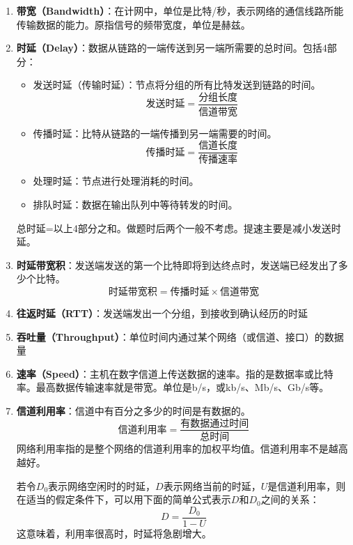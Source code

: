 \documentclass[12pt, a4paper, oneside]{ctexart}
\begin{document}
\begin{enumerate}
    \item {\bf 带宽（Bandwidth）}：在计网中，单位是比特/秒，表示网络的通信线路所能传输数据的能力。原指信号的频带宽度，单位是赫兹。
    \item {\bf 时延（Delay）}：数据从链路的一端传送到另一端所需要的总时间。包括4部分：
    \begin{itemize}
        \item 发送时延（传输时延）：节点将分组的所有比特发送到链路的时间。
        \begin{equation*}
            \text{发送时延}=\frac{\text{分组长度}}{\text{信道带宽}}
        \end{equation*}
        \item 传播时延：比特从链路的一端传播到另一端需要的时间。
        \begin{equation*}
            \text{传播时延}=\frac{\text{信道长度}}{\text{传播速率}}
        \end{equation*}
        \item 处理时延：节点进行处理消耗的时间。
        \item 排队时延：数据在输出队列中等待转发的时间。
    \end{itemize}
    总时延=以上4部分之和。做题时后两个一般不考虑。提速主要是减小发送时延。
    \item {\bf 时延带宽积}：发送端发送的第一个比特即将到达终点时，发送端已经发出了多少个比特。
    \begin{equation*}
        \text{时延带宽积}=\text{传播时延}\times \text{信道带宽}
    \end{equation*}
    \item {\bf 往返时延（RTT）}：发送端发出一个分组，到接收到确认经历的时延
    \item {\bf 吞吐量（Throughput）}：单位时间内通过某个网络（或信道、接口）的数据量
    \item {\bf 速率（Speed）}：主机在数字信道上传送数据的速率。指的是数据率或比特率。最高数据传输速率就是带宽。单位是b/s，或kb/s、Mb/s、Gb/s等。
    \item {\bf 信道利用率}：信道中有百分之多少的时间是有数据的。
    \begin{equation*}
        \text{信道利用率}=\frac{\text{有数据通过时间}}{\text{总时间}}
    \end{equation*}
    网络利用率指的是整个网络的信道利用率的加权平均值。信道利用率不是越高越好。

    若令$D_0$表示网络空闲时的时延，$D$表示网络当前的时延，$U$是信道利用率，则在适当的假定条件下，可以用下面的简单公式表示$D$和$D_0$之间的关系：
    \begin{equation*}
        D=\frac{D_0}{1-U}
    \end{equation*}
    这意味着，利用率很高时，时延将急剧增大。
\end{enumerate}
\end{document}
